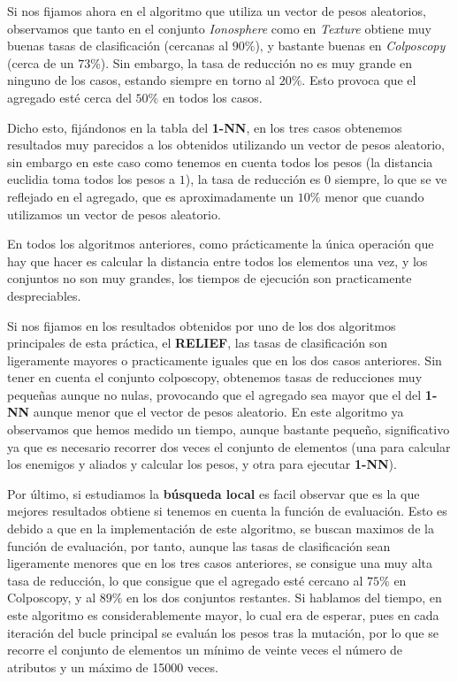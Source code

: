 \documentclass[size=a4, parskip=half, titlepage=false, toc=flat, toc=bib, 12pt]{scrartcl}
\begin{document}
Si nos fijamos ahora en el algoritmo que utiliza un vector de pesos aleatorios, observamos que tanto en el conjunto \textit{Ionosphere} como en \textit{Texture} obtiene muy buenas tasas de clasificación (cercanas al $90\%$), y bastante buenas en \textit{Colposcopy} (cerca de un $73\%$). Sin embargo, la tasa de reducción no es muy grande en ninguno de los casos, estando siempre en torno al $20\%$. Esto provoca que el agregado esté cerca del $50\%$ en todos los casos.

Dicho esto, fijándonos en la tabla del \textbf{1-NN}, en los tres casos obtenemos resultados muy parecidos a los obtenidos utilizando un vector de pesos aleatorio, sin embargo en este caso como tenemos en cuenta todos los pesos (la distancia euclidia toma todos los pesos a $1$), la tasa de reducción es $0$ siempre, lo que se ve reflejado en el agregado, que es aproximadamente un $10\%$ menor que cuando utilizamos un vector de pesos aleatorio.

En todos los algoritmos anteriores, como prácticamente la única operación que hay que hacer es calcular la distancia entre todos los elementos una vez, y los conjuntos no son muy grandes, los tiempos de ejecución son practicamente despreciables.

Si nos fijamos en los resultados obtenidos por uno de los dos algoritmos principales de esta práctica, el \textbf{RELIEF}, las tasas de clasificación son ligeramente mayores o practicamente iguales que en los dos casos anteriores. Sin tener en cuenta el conjunto colposcopy, obtenemos tasas de reducciones muy pequeñas aunque no nulas, provocando que el agregado sea mayor que el del \textbf{1-NN} aunque menor que el vector de pesos aleatorio. En este algoritmo ya observamos que hemos medido un tiempo, aunque bastante pequeño, significativo ya que es necesario recorrer dos veces el conjunto de elementos (una para calcular los enemigos y aliados y calcular los pesos, y otra para ejecutar \textbf{1-NN}).

Por último, si estudiamos la \textbf{búsqueda local} es facil observar que es la que mejores resultados obtiene si tenemos en cuenta la función de evaluación. Esto es debido a que en la implementación de este algoritmo, se buscan maximos de la función de evaluación, por tanto, aunque las tasas de clasificación sean ligeramente menores que en los tres casos anteriores, se consigue una muy alta tasa de reducción, lo que consigue que el agregado esté cercano al $75\%$ en Colposcopy, y al  $89\%$ en los dos conjuntos restantes. Si hablamos del tiempo, en este algoritmo es considerablemente mayor, lo cual era de esperar, pues en cada iteración del bucle principal se evaluán los pesos tras la mutación, por lo que se recorre el conjunto de elementos un mínimo de veinte veces el número de atributos y un máximo de 15000 veces.
\end{document}
